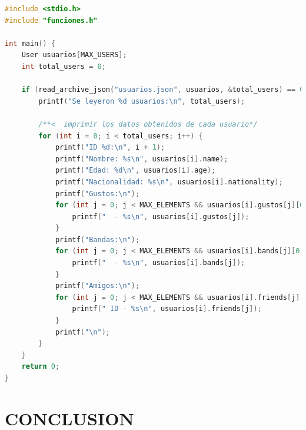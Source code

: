 \begin{lstlisting}[style=CodeStyle, language=C, caption={main.c}, label={lst:codigo}]
#include <stdio.h>
#include "funciones.h"

int main() {
    User usuarios[MAX_USERS];
    int total_users = 0;

    if (read_archive_json("usuarios.json", usuarios, &total_users) == 0) {
        printf("Se leyeron %d usuarios:\n", total_users);

        /**<  imprimir los datos obtenidos de cada usuario*/
        for (int i = 0; i < total_users; i++) {
            printf("ID %d:\n", i + 1);
            printf("Nombre: %s\n", usuarios[i].name);
            printf("Edad: %d\n", usuarios[i].age);
            printf("Nacionalidad: %s\n", usuarios[i].nationality);
            printf("Gustos:\n");
            for (int j = 0; j < MAX_ELEMENTS && usuarios[i].gustos[j][0]; j++) {
                printf("  - %s\n", usuarios[i].gustos[j]);
            }
            printf("Bandas:\n");
            for (int j = 0; j < MAX_ELEMENTS && usuarios[i].bands[j][0]; j++) {
                printf("  - %s\n", usuarios[i].bands[j]);
            }
            printf("Amigos:\n");
            for (int j = 0; j < MAX_ELEMENTS && usuarios[i].friends[j][0]; j++) {
                printf(" ID - %s\n", usuarios[i].friends[j]);
            }
            printf("\n");
        }
    }
    return 0;
}

\end{lstlisting}






\section{CONCLUSION}
